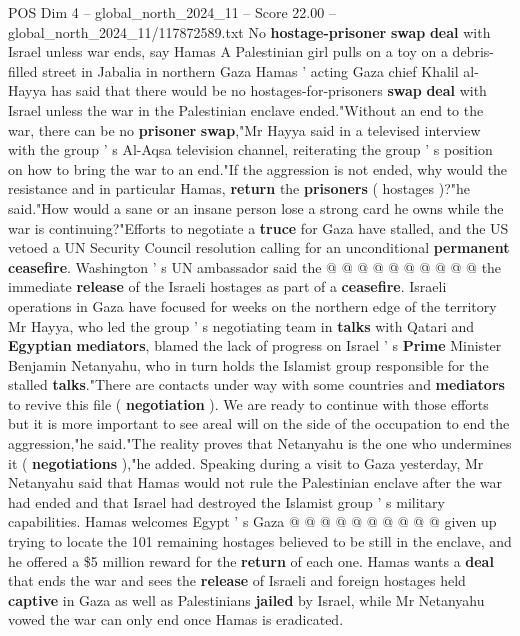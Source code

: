 \begin{textsample}{POS Dim 4 – global\_north\_2024\_11 – Score 22.00 – global\_north\_2024\_11/117872589.txt}  \label{ex:f4_pos_281}
No \textbf{hostage-prisoner} \textbf{swap} \textbf{deal} with Israel unless war ends, say Hamas A Palestinian girl pulls on a toy on a debris-filled street in Jabalia in northern Gaza Hamas ' acting Gaza chief Khalil al-Hayya has said that there would be no hostages-for-prisoners \textbf{swap} \textbf{deal} with Israel unless the war in the Palestinian enclave ended."Without an end to the war, there can be no \textbf{prisoner} \textbf{swap},"Mr Hayya said in a televised interview with the group ' s Al-Aqsa television channel, reiterating the group ' s position on how to bring the war to an end."If the aggression is not ended, why would the resistance and in particular Hamas, \textbf{return} the \textbf{prisoners} ( hostages )?"he said."How would a sane or an insane person lose a strong card he owns while the war is continuing?"Efforts to negotiate a \textbf{truce} for Gaza have stalled, and the US vetoed a UN Security Council resolution calling for an unconditional \textbf{permanent} \textbf{ceasefire}.
Washington ' s UN ambassador said the @ @ @ @ @ @ @ @ @ @ the immediate \textbf{release} of the Israeli hostages as part of a \textbf{ceasefire}.
Israeli operations in Gaza have focused for weeks on the northern edge of the territory Mr Hayya, who led the group ' s negotiating team in \textbf{talks} with Qatari and \textbf{Egyptian} \textbf{mediators}, blamed the lack of progress on Israel ' s \textbf{Prime} Minister Benjamin Netanyahu, who in turn holds the Islamist group responsible for the stalled \textbf{talks}."There are contacts under way with some countries and \textbf{mediators} to revive this file ( \textbf{negotiation} ).
We are ready to continue with those efforts but it is more important to see areal will on the side of the occupation to end the aggression,"he said."The reality proves that Netanyahu is the one who undermines it ( \textbf{negotiations} ),"he added.
Speaking during a visit to Gaza yesterday, Mr Netanyahu said that Hamas would not rule the Palestinian enclave after the war had ended and that Israel had destroyed the Islamist group ' s military capabilities.
Hamas welcomes Egypt ' s Gaza @ @ @ @ @ @ @ @ @ @ given up trying to locate the 101 remaining hostages believed to be still in the enclave, and he offered a \$5 million reward for the \textbf{return} of each one.
Hamas wants a \textbf{deal} that ends the war and sees the \textbf{release} of Israeli and foreign hostages held \textbf{captive} in Gaza as well as Palestinians \textbf{jailed} by Israel, while Mr Netanyahu vowed the war can only end once Hamas is eradicated.

\end{textsample}
